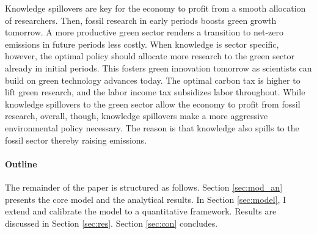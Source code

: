 Knowledge spillovers are key for the economy to profit from a smooth allocation of researchers. Then, fossil research in early periods boosts green growth tomorrow. A more productive green sector renders a transition to net-zero emissions in future periods less costly. When knowledge is sector specific, however, the optimal policy should allocate more research to the green sector already in initial periods. This fosters green innovation tomorrow as scientists can build on green technology advances today. The optimal carbon tax is higher to lift green research, and the labor income tax subsidizes labor throughout. While knowledge spillovers to the green sector allow the economy to profit from fossil research, overall, though, knowledge spillovers make a more aggressive environmental policy necessary. The reason is that knowledge also spills to the fossil sector thereby raising emissions.  



\paragraph{Outline}
The remainder of the paper is structured as follows. Section \ref{sec:mod_an} presents the core model and the analytical results. In Section \ref{sec:model}, I extend and calibrate the model to a quantitative framework.  Results are discussed in Section \ref{sec:res}. Section \ref{sec:con} concludes.